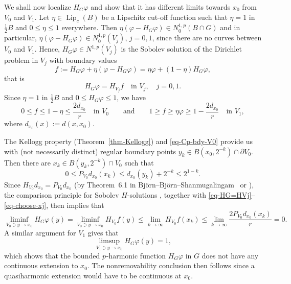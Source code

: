 \documentclass[a4paper,twoside]{article}
\makeatletter
\theoremstyle{propositional}
\theoremstyle{descriptive}
\theoremstyle{remarkstyle}
\renewenvironment{proof}[1][\proofname]{\par
  \pushQED{\qed}%
  \normalfont
  \trivlist
  \item[\hskip\labelsep
        \itshape
    #1\@addpunct{.}]\ignorespaces
}{%
  \popQED\endtrivlist\@endpefalse
}
\DeclareMathOperator{\Lip}{Lip}
\newcommand{\Lipc}{{\Lip_c}}
\newcommand{\bdry}{\partial}
\newcommand{\bdy}{\bdry}
\renewcommand{\phi}{\varphi}
\newcommand{\p}{{$p\mspace{1mu}$}}
\newcommand{\Np}{N^{1,p}}
\numberwithin{equation}{section}
\makeatother
\begin{document}
\begin{proof}[Proof of Proposition~\ref{prop-not-locconn}]
We shall now localize $H_G \phi$ 
and show that it has different limits towards $x_0$
from $V_0$ and $V_1$. 
Let $\eta \in \Lipc(B)$ be a Lipschitz cut-off function such that
$\eta=1$ in $\tfrac12 B$ and $0 \le \eta \le 1$ everywhere.
Then $\eta (\phi- H_G \phi) \in \Np_0(B \cap G)$ and in particular,
$\eta (\phi- H_G \phi) \in \Np_0(V_j)$, $j=0,1$, since there are no curves 
between $V_0$ and $V_1$. 
Hence, $H_G\phi\in\Np(V_j)$ is the Sobolev solution of the
Dirichlet problem in $V_j$ with boundary values
\[
f:= H_G \phi + \eta (\phi- H_G \phi)
   = \eta \phi + (1-\eta) H_G \phi,
\]
that is
\begin{equation} \label{eq-HG=HVj}
H_G \phi    =  H_{V_j} f \quad \text{in } V_j,  \quad j=0,1.
\end{equation}
Since $\eta=1$ in $\tfrac12 B$ and $0\le H_G\phi\le 1$, we have
\begin{equation}   \label{eq-bound-f} %
0\le f \le 1-\eta
\le \frac{2d_{x_0}}{r} \quad \text{in } V_0
\qquad \text{and} \qquad %
1\ge f \ge \eta\phi \ge 1- \frac{2d_{x_0}}{r} \quad \text{in } V_1,
\end{equation}
where $d_{x_0}(x) := d(x,x_0)$.

The Kellogg property (Theorem~\ref{thm-Kellogg}) 
and \eqref{eq-Cp-bdy-V0}
provide  us with (not necessarily distinct) regular boundary
points $y_k \in B(x_0,2^{-k})\cap \bdy V_0$.
Then there are $x_k\in B(y_k,2^{-k})\cap V_0$ such that
\begin{equation}   \label{eq-choose-xj}
0\le P_{V_0} d_{x_0} (x_k) \le d_{x_0}(y_k) + 2^{-k}
\le 2^{1-k}.
\end{equation}
Since $H_{V_0} d_{x_0}=P_{V_0} d_{x_0}$ (by 
Theorem~6.1
in Bj\"orn--Bj\"orn--Shan\-mu\-ga\-lin\-gam~\cite{BBS2} or
\cite[Theorem~10.15]{BBbook}),
the comparison principle for Sobolev $H$-solutions
\cite[Lemma~8.32]{BBbook},
together with \eqref{eq-HG=HVj}--\eqref{eq-choose-xj},  then implies
that
\[
\liminf_{V_0\ni y\to x_0} H_G \phi (y)
= \liminf_{V_0\ni y\to x_0} H_{V_0} f (y)
\le\lim_{k\to\infty} H_{V_0} f(x_k) 
\le \lim_{k\to\infty} \frac{2 P_{V_0} d_{x_0} (x_k)}{r} =0.
\]
A similar argument for $V_1$ gives that 
\[
\limsup_{V_1\ni y\to x_0} H_G \phi (y)=1,
\]
which shows that the bounded \p-harmonic function $H_G \phi$ in $G$
does not have any continuous extension to $x_0$. 
The nonremovability conclusion then follows since a quasiharmonic extension
would have to be continuous at $x_0$.
\end{proof}
\end{document}
